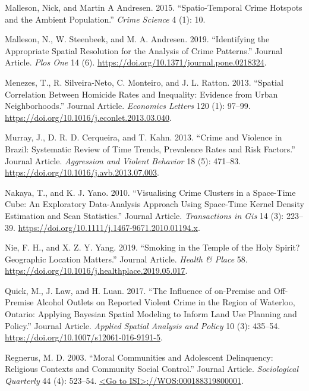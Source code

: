 \documentclass[smallextended]{svjour3}       %
\begin{document}
\leavevmode\hypertarget{ref-Malleson2015spatio}{}%
Malleson, Nick, and Martin A Andresen. 2015. ``Spatio-Temporal Crime
Hotspots and the Ambient Population.'' \emph{Crime Science} 4 (1): 10.

\leavevmode\hypertarget{ref-Malleson2019identifying}{}%
Malleson, N., W. Steenbeek, and M. A. Andresen. 2019. ``Identifying the
Appropriate Spatial Resolution for the Analysis of Crime Patterns.''
Journal Article. \emph{Plos One} 14 (6).
\url{https://doi.org/10.1371/journal.pone.0218324}.

\leavevmode\hypertarget{ref-Menezes2013spatial}{}%
Menezes, T., R. Silveira-Neto, C. Monteiro, and J. L. Ratton. 2013.
``Spatial Correlation Between Homicide Rates and Inequality: Evidence
from Urban Neighborhoods.'' Journal Article. \emph{Economics Letters}
120 (1): 97--99. \url{https://doi.org/10.1016/j.econlet.2013.03.040}.

\leavevmode\hypertarget{ref-Murray2013crime}{}%
Murray, J., D. R. D. Cerqueira, and T. Kahn. 2013. ``Crime and Violence
in Brazil: Systematic Review of Time Trends, Prevalence Rates and Risk
Factors.'' Journal Article. \emph{Aggression and Violent Behavior} 18
(5): 471--83. \url{https://doi.org/10.1016/j.avb.2013.07.003}.

\leavevmode\hypertarget{ref-Nakaya2010visualizing}{}%
Nakaya, T., and K. J. Yano. 2010. ``Visualising Crime Clusters in a
Space-Time Cube: An Exploratory Data-Analysis Approach Using Space-Time
Kernel Density Estimation and Scan Statistics.'' Journal Article.
\emph{Transactions in Gis} 14 (3): 223--39.
\url{https://doi.org/10.1111/j.1467-9671.2010.01194.x}.

\leavevmode\hypertarget{ref-Nie2019smoking}{}%
Nie, F. H., and X. Z. Y. Yang. 2019. ``Smoking in the Temple of the Holy
Spirit? Geographic Location Matters.'' Journal Article. \emph{Health \&
Place} 58. \url{https://doi.org/10.1016/j.healthplace.2019.05.017}.

\leavevmode\hypertarget{ref-Quick2017influence}{}%
Quick, M., J. Law, and H. Luan. 2017. ``The Influence of on-Premise and
Off-Premise Alcohol Outlets on Reported Violent Crime in the Region of
Waterloo, Ontario: Applying Bayesian Spatial Modeling to Inform Land Use
Planning and Policy.'' Journal Article. \emph{Applied Spatial Analysis
and Policy} 10 (3): 435--54.
\url{https://doi.org/10.1007/s12061-016-9191-5}.

\leavevmode\hypertarget{ref-Regnerus2003moral}{}%
Regnerus, M. D. 2003. ``Moral Communities and Adolescent Delinquency:
Religious Contexts and Community Social Control.'' Journal Article.
\emph{Sociological Quarterly} 44 (4): 523--54.
\href{\%3CGo\%20to\%20ISI\%3E://WOS:000188319800001}{\textless{}Go to ISI\textgreater{}://WOS:000188319800001}.
\end{document}
